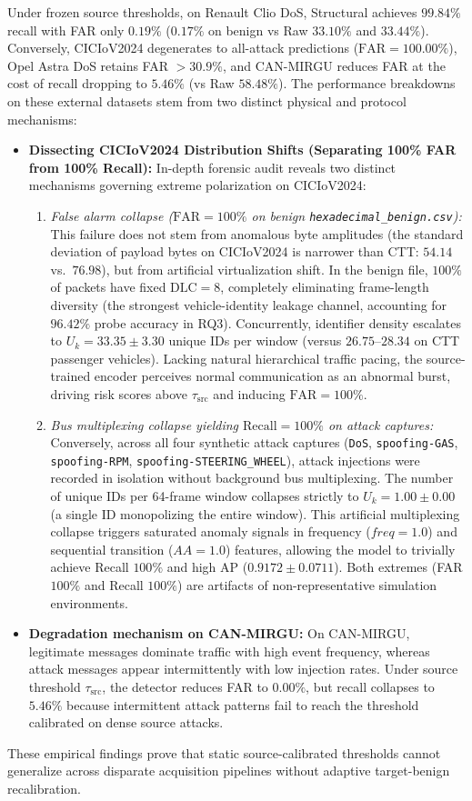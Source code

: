 \documentclass[12pt, a4paper, reqno, oneside]{book}
\DeclareRobustCommand{\code}[1]{\nolinkurl{#1}}
\begin{document}
Under frozen source thresholds, on Renault Clio DoS, Structural achieves $99.84\%$ recall with FAR only $0.19\%$ ($0.17\%$ on benign vs Raw $33.10\%$ and $33.44\%$). Conversely, CICIoV2024 degenerates to all-attack predictions ($\text{FAR}=100.00\%$), Opel Astra DoS retains FAR $>30.9\%$, and CAN-MIRGU reduces FAR at the cost of recall dropping to $5.46\%$ (vs Raw $58.48\%$). The performance breakdowns on these external datasets stem from two distinct physical and protocol mechanisms:
\begin{itemize}
    \item \textbf{Dissecting CICIoV2024 Distribution Shifts (Separating 100\% FAR from 100\% Recall):} In-depth forensic audit reveals two distinct mechanisms governing extreme polarization on CICIoV2024:
    \begin{enumerate}
        \item \textit{False alarm collapse ($\text{FAR}=100\%$ on benign \code{hexadecimal_benign.csv}):} This failure does not stem from anomalous byte amplitudes (the standard deviation of payload bytes on CICIoV2024 is narrower than CTT: $54.14$ vs.\ $76.98$), but from artificial virtualization shift. In the benign file, $100\%$ of packets have fixed $\text{DLC} = 8$, completely eliminating frame-length diversity (the strongest vehicle-identity leakage channel, accounting for $96.42\%$ probe accuracy in RQ3). Concurrently, identifier density escalates to $U_k = 33.35 \pm 3.30$ unique IDs per window (versus $26.75\text{--}28.34$ on CTT passenger vehicles). Lacking natural hierarchical traffic pacing, the source-trained encoder perceives normal communication as an abnormal burst, driving risk scores above $\tau_{\text{src}}$ and inducing $\text{FAR} = 100\%$.
        \item \textit{Bus multiplexing collapse yielding $\text{Recall}=100\%$ on attack captures:} Conversely, across all four synthetic attack captures (\code{DoS}, \code{spoofing-GAS}, \code{spoofing-RPM}, \code{spoofing-STEERING_WHEEL}), attack injections were recorded in isolation without background bus multiplexing. The number of unique IDs per 64-frame window collapses strictly to $U_k = 1.00 \pm 0.00$ (a single ID monopolizing the entire window). This artificial multiplexing collapse triggers saturated anomaly signals in frequency ($freq=1.0$) and sequential transition ($AA=1.0$) features, allowing the model to trivially achieve Recall $100\%$ and high AP ($0.9172 \pm 0.0711$). Both extremes (FAR $100\%$ and Recall $100\%$) are artifacts of non-representative simulation environments.
    \end{enumerate}
    \item \textbf{Degradation mechanism on CAN-MIRGU:} On CAN-MIRGU, legitimate messages dominate traffic with high event frequency, whereas attack messages appear intermittently with low injection rates. Under source threshold $\tau_{\text{src}}$, the detector reduces FAR to $0.00\%$, but recall collapses to $5.46\%$ because intermittent attack patterns fail to reach the threshold calibrated on dense source attacks.\end{itemize}
These empirical findings prove that static source-calibrated thresholds cannot generalize across disparate acquisition pipelines without adaptive target-benign recalibration.
\end{document}
